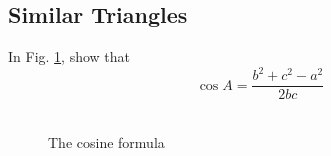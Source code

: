 \subsection{Similar Triangles}
\begin{problem}
In Fig. \ref{ch2_cosine_formula}, show that
%
\begin{equation}
\cos A = \frac{b^2+c^2-a^2}{2bc}
\end{equation}
%
\
\end{problem}
\begin{figure}[!ht]
	\begin{center}
		
		\resizebox{\columnwidth}{!}{}
	\end{center}
	\caption{The cosine formula}
	\label{ch2_cosine_formula}	
\end{figure}

